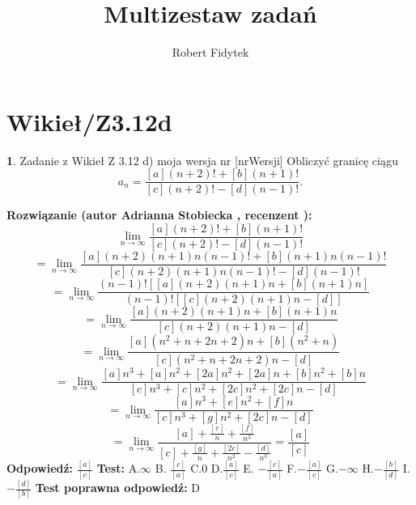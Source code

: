 \documentclass[12pt, a4paper]{article}
\title{Multizestaw zadań}
\author{Robert Fidytek}
\date{}
\theoremstyle{definition} %
\newtheorem{zad}{}
\newcommand{\kategoria}[1]{\section{#1}} %
\newcommand{\zadStart}[1]{\begin{zad}#1\newline} %
\newcommand{\zadStop}{\end{zad}}   %
\newcommand{\rozwStart}[2]{\noindent \textbf{Rozwiązanie (autor #1 , recenzent #2): }\newline} %
\newcommand{\rozwStop}{\newline}                                            %
\newcommand{\odpStart}{\noindent \textbf{Odpowiedź:}\newline}    %
\newcommand{\odpStop}{\newline}                                             %
\newcommand{\testStart}{\noindent \textbf{Test:}\newline} %
\newcommand{\testStop}{\newline} %
\newcommand{\kluczStart}{\noindent \textbf{Test poprawna odpowiedź:}\newline} %
\newcommand{\kluczStop}{\newline} %
\begin{document}
\maketitle


\kategoria{Wikieł/Z3.12d}
\zadStart{Zadanie z Wikieł Z 3.12 d) moja wersja nr [nrWersji]}
Obliczyć granicę ciągu 
$$a_n=\frac{[a](n+2)!+[b](n+1)!}{[c](n+2)!-[d](n-1)!}.$$
\zadStop
\rozwStart{Adrianna Stobiecka}{}
$$\lim_{n\to\infty}\frac{[a](n+2)!+[b](n+1)!}{[c](n+2)!-[d](n-1)!}$$
$$=\lim_{n\to\infty}\frac{[a](n+2)(n+1)n(n-1)!+[b](n+1)n(n-1)!}{[c](n+2)(n+1)n(n-1)!-[d](n-1)!}$$
$$=\lim_{n\to\infty}\frac{(n-1)![[a](n+2)(n+1)n+[b](n+1)n]}{(n-1)![[c](n+2)(n+1)n-[d]]}$$
$$=\lim_{n\to\infty}\frac{[a](n+2)(n+1)n+[b](n+1)n}{[c](n+2)(n+1)n-[d]}$$
$$=\lim_{n\to\infty}\frac{[a](n^2+n+2n+2)n+[b](n^2+n)}{[c](n^2+n+2n+2)n-[d]}$$
$$=\lim_{n\to\infty}\frac{[a]n^3+[a]n^2+[2a]n^2+[2a]n+[b]n^2+[b]n}{[c]n^3+[c]n^2+[2c]n^2+[2c]n-[d]}$$
$$=\lim_{n\to\infty}\frac{[a]n^3+[e]n^2+[f]n}{[c]n^3+[g]n^2+[2c]n-[d]}$$
$$=\lim_{n\to\infty}\frac{[a]+\frac{[e]}{n}+\frac{[f]}{n^2}}{[c]+\frac{[g]}{n}+\frac{[2c]}{n^2}-\frac{[d]}{n^3}}=\frac{[a]}{[c]}$$
\rozwStop
\odpStart
 $\frac{[a]}{[c]}$
\odpStop
\testStart
A.$\infty$
B. $\frac{[c]}{[a]}$
C.$0$
D.$\frac{[a]}{[c]}$
E. $-\frac{[c]}{[a]}$
F.$-\frac{[a]}{[c]}$
G.$-\infty$
H.$-\frac{[b]}{[d]}$
I.$-\frac{[d]}{[b]}$
\testStop
\kluczStart
D
\kluczStop
\end{document}
